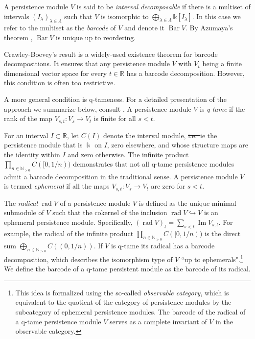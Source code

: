 \documentclass{amsart}
\makeatletter
\renewcommand\subsubsection{\@startsection{subsubsection}{3}
	\z@{.5\linespacing\@plus.7\linespacing}{0em}
	{\normalfont\itshape}}
\theoremstyle{definition}
\newcommand{\N}{\mathbb{N}}
\newcommand{\R}{\mathbb{R}}
\newcommand{\kk}{\mathbb{k}}
\newcommand{\darkblue}{\color{darkblue}}
\newcommand{\defn}[1]{{\darkblue \emph{#1}}}
\DeclareMathOperator{\rad}{rad}
\theoremstyle{theorem}
\DeclareMathOperator{\barc}{Bar}
\DeclareMathOperator{\img}{Im}
\providecommand{\DIFaddtex}[1]{{\protect\color{blue}\uwave{#1}}} %
\providecommand{\DIFdeltex}[1]{{\protect\color{red}\sout{#1}}}                      %
\providecommand{\DIFaddbegin}{} %
\providecommand{\DIFaddend}{} %
\providecommand{\DIFdelbegin}{} %
\providecommand{\DIFdelend}{} %
\providecommand{\DIFadd}[1]{\texorpdfstring{\DIFaddtex{#1}}{#1}} %
\providecommand{\DIFdel}[1]{\texorpdfstring{\DIFdeltex{#1}}{}} %
\newcommand{\DIFscaledelfig}{0.5}
\newlength{\DIFdelgraphicswidth} %
\newlength{\DIFdelgraphicsheight} %
\newcommand{\DIFaddincludegraphics}[2][]{{\color{blue}\fbox{\DIFOincludegraphics[#1]{#2}}}} %
\newcommand{\DIFdelincludegraphics}[2][]{%
\sbox{\DIFdelgraphicsbox}{\DIFOincludegraphics[#1]{#2}}%
\settoboxwidth{\DIFdelgraphicswidth}{\DIFdelgraphicsbox} %
\settoboxtotalheight{\DIFdelgraphicsheight}{\DIFdelgraphicsbox} %
\scalebox{\DIFscaledelfig}{%
\parbox[b]{\DIFdelgraphicswidth}{\usebox{\DIFdelgraphicsbox}\\[-\baselineskip] \rule{\DIFdelgraphicswidth}{0em}}\llap{\resizebox{\DIFdelgraphicswidth}{\DIFdelgraphicsheight}{%
\setlength{\unitlength}{\DIFdelgraphicswidth}%
\begin{picture}(1,1)%
\thicklines\linethickness{2pt} %
{\color[rgb]{1,0,0}\put(0,0){\framebox(1,1){}}}%
{\color[rgb]{1,0,0}\put(0,0){\line( 1,1){1}}}%
{\color[rgb]{1,0,0}\put(0,1){\line(1,-1){1}}}%
\end{picture}%
}\hspace*{3pt}}} %
} %
\DeclareRobustCommand{\DIFaddbegin}{\DIFOaddbegin \let\includegraphics\DIFaddincludegraphics} %
\DeclareRobustCommand{\DIFaddend}{\DIFOaddend \let\includegraphics\DIFOincludegraphics} %
\DeclareRobustCommand{\DIFdelbegin}{\DIFOdelbegin \let\includegraphics\DIFdelincludegraphics} %
\DeclareRobustCommand{\DIFdelend}{\DIFOaddend \let\includegraphics\DIFOincludegraphics} %
\renewcommand{\DIFadd}[1]{{\color{red}#1}}
\renewcommand{\DIFdel}[1]{{\color{deletedpurple}\ifmmode\oldmath{#1}\else\sout{#1}\fi}}
\newcommand{\oldmath}[1]{{\color{deletedpurple}\mathpalette\horizontalstrike{#1}}}
\newcommand{\horizontalstrike}[2]{\sbox0{$#1#2$}\rlap{\raisebox{.5\ht0}{\rule{\wd0}{.4pt}}}\usebox0}
\makeatother
\begin{document}
A persistence module $V$ is said to be \defn{interval decomposable} if there is a multiset of intervals $(I_\lambda)_{\lambda \in \Lambda}$ such that $V$ is isomorphic to $\bigoplus_{\lambda \in \Lambda} \kk[I_\lambda]$.
In this case we refer to the multiset as the \defn{barcode} of $V$ and denote it $\barc V$.
By Azumaya’s theorem \cite{azumaya1950theorem}, $\barc V$ is unique up to reordering.

\subsubsection{}

Crawley-Boevey's result \cite{Crawley-Boevey.2015} is a widely-used existence theorem for barcode decompositions.
It ensures that any persistence module \(V\) with \(V_t\) being a finite dimensional vector space for every \(t \in \R\) has a barcode decomposition.
However, this condition is often too restrictive.

A more general condition is q-tameness.
For a detailed presentation of the approach we summarize below, consult \cite{Chazal.2016a, Chazal.2016b}.
A persistence module \(V\) is \defn{q-tame} if the rank of the map \(V_{s,t} \colon V_s \to V_t\) is finite for all \(s < t\).

For an interval \(I \subset \R\), let \(C(I)\) denote the interval module, \DIFdelbegin \DIFdel{i.e.\ }\DIFdelend \DIFaddbegin \DIFadd{ie }\DIFaddend the persistence module that is \(\Bbbk\) on \(I\), zero elsewhere, and whose structure maps are the identity within \(I\) and zero otherwise.
The infinite product \(\prod_{n \in \N_{> 0}} C([0,1/n))\) demonstrates that not all q-tame persistence modules admit a barcode decomposition in the traditional sense.
A persistence module \(V\) is termed \defn{ephemeral} if all the maps \(V_{s,t} \colon V_s \to V_t\) are zero for \(s < t\).

The \defn{radical} \(\rad V\) of a persistence module \(V\) is defined as the unique minimal submodule of \(V\) such that the cokernel of the inclusion \(\rad V \hookrightarrow V\) is an ephemeral persistence module.
Specifically, \((\rad V)_t = \sum_{s<t} \img V_{s,t}\).
For example, the radical of the infinite product \(\prod_{n \in \N_{> 0}} C([0, 1/n))\) is the direct sum \(\bigoplus_{n \in \N_{> 0}} C((0,1/n))\).
If \(V\) is q-tame its radical has a barcode decomposition, which describes the isomorphism type of \(V\) ``up to ephemerals".\footnote{
This idea is formalized using the so-called \textit{observable category}, which is equivalent to the quotient of the category of persistence modules by the subcategory of ephemeral persistence modules.
The barcode of the radical of a q-tame persistence module \(V\) serves as a complete invariant of \(V\) in the observable category.}
We define the barcode of a q-tame persistent module as the barcode of its radical.
\end{document}
